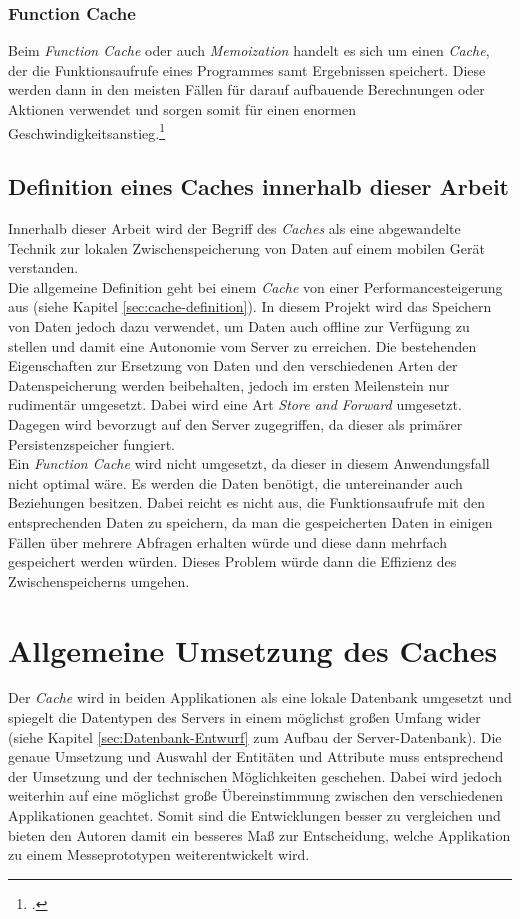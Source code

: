 \subsubsection*{Function Cache}
\label{sssec:cache-function-cache}
Beim \textit{Function Cache} oder auch \textit{Memoization} handelt es sich um einen \textit{Cache}, der die Funktionsaufrufe eines Programmes samt Ergebnissen speichert. Diese werden dann in den meisten Fällen für darauf aufbauende Berechnungen oder Aktionen verwendet und sorgen somit für einen enormen Geschwindigkeitsanstieg.\footcite{Cache-Memoization}
\subsection{Definition eines Caches innerhalb dieser Arbeit}
\label{ssec:cache-unsere-definition}
Innerhalb dieser Arbeit wird der Begriff des \textit{Caches} als eine abgewandelte Technik zur lokalen Zwischenspeicherung von Daten auf einem mobilen Gerät verstanden. \\
Die allgemeine Definition geht bei einem \textit{Cache} von einer Performancesteigerung aus (siehe Kapitel \ref{sec:cache-definition}). In diesem Projekt wird das Speichern von Daten jedoch dazu verwendet, um Daten auch offline zur Verfügung zu stellen und damit eine Autonomie vom Server zu erreichen. Die bestehenden Eigenschaften zur Ersetzung von Daten und den verschiedenen Arten der Datenspeicherung werden beibehalten, jedoch im ersten Meilenstein nur rudimentär umgesetzt. Dabei wird eine Art \textit{Store and Forward} umgesetzt. Dagegen wird bevorzugt auf den Server zugegriffen, da dieser als primärer Persistenzspeicher fungiert. \\
Ein \textit{Function Cache} wird nicht umgesetzt, da dieser in diesem Anwendungsfall nicht optimal wäre. Es werden die Daten benötigt, die untereinander auch Beziehungen besitzen. Dabei reicht es nicht aus, die Funktionsaufrufe mit den entsprechenden Daten zu speichern, da man die gespeicherten Daten in einigen Fällen über mehrere Abfragen erhalten würde und diese dann mehrfach gespeichert werden würden. Dieses Problem würde dann die Effizienz des Zwischenspeicherns umgehen.
\section{Allgemeine Umsetzung des Caches}
\label{sec:cache-umsetzung}
Der \textit{Cache} wird in beiden Applikationen als eine lokale Datenbank umgesetzt und spiegelt die Datentypen des Servers in einem möglichst großen Umfang wider (siehe Kapitel \ref{sec:Datenbank-Entwurf} zum Aufbau der Server-Datenbank). Die genaue Umsetzung und Auswahl der Entitäten und Attribute muss entsprechend der Umsetzung und der technischen Möglichkeiten geschehen. Dabei wird jedoch weiterhin auf eine möglichst große Übereinstimmung zwischen den verschiedenen Applikationen geachtet. Somit sind die Entwicklungen besser zu vergleichen und bieten den Autoren damit ein besseres Maß zur Entscheidung, welche Applikation zu einem Messeprototypen weiterentwickelt wird.
